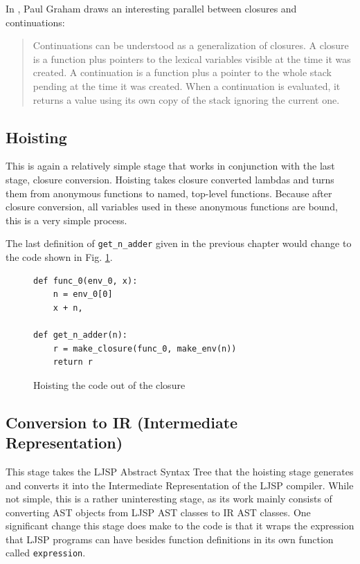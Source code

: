 \documentclass[11pt]{report}
\begin{document}
In \cite{onlisp}, Paul Graham draws an interesting parallel between closures and continuations:
\begin{quote}
Continuations can be understood as a generalization of closures. A closure is a function plus pointers to the lexical variables visible at the time it was created. A continuation is a function plus a pointer to the whole stack pending at the time it was created. When a continuation is evaluated, it returns a value using its own copy of the stack ignoring the current one.
\end{quote}



\subsection{Hoisting}
This is again a relatively simple stage that works in conjunction with the last stage, closure conversion. Hoisting takes closure converted lambdas and turns them from anonymous functions to named, top-level functions. Because after closure conversion, all variables used in these anonymous functions are bound, this is a very simple process.

The last definition of \texttt{get_n_adder} given in the previous chapter would change to the code shown in Fig. \ref{hoisting}.

\begin{figure}[ht]
\begin{lstlisting}
def func_0(env_0, x):
    n = env_0[0]
    x + n, 
    
def get_n_adder(n):
    r = make_closure(func_0, make_env(n))
    return r
\end{lstlisting}
\caption{Hoisting the code out of the closure}
\label{hoisting}
\end{figure}

\subsection{Conversion to IR (Intermediate Representation)}
This stage takes the LJSP Abstract Syntax Tree that the hoisting stage generates and converts it into the Intermediate Representation of the LJSP compiler. While not simple, this is a rather uninteresting stage, as its work mainly consists of converting AST objects from LJSP AST classes to IR AST classes. One significant change this stage does make to the code is that it wraps the expression that LJSP programs can have besides function definitions in its own function called \texttt{expression}.
\end{document}
